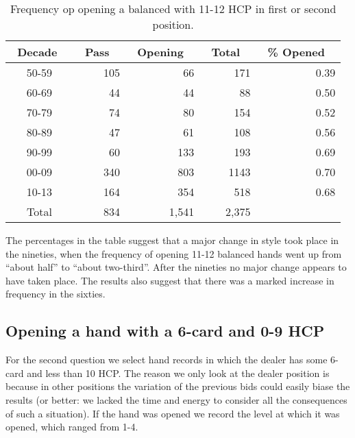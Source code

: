 \documentclass{icga}
\begin{document}
\begin{table}
\centering\footnotesize
\begin{tabular}{|c|r|r|r|r|}
\hline
\bf \ Decade \ & \bf \ Pass \ & \bf \ Opening \ & \bf \ Total \  & 
\bf \ \% Opened \ \\ \hline 
50-59 & 105 & 66 & 171 & 0.39\\
60-69 & 44 & 44 & 88 & 0.50\\
70-79 & 74 & 80 & 154 & 0.52\\
80-89 & 47 & 61 & 108 & 0.56\\
90-99 & 60 & 133 & 193 & 0.69\\
00-09 & 340 & 803 & 1143 & 0.70\\
10-13 & 164 & 354 & 518 & 0.68 \\ 
\hline
Total & 834 & 1,541 & 2,375 & \\ 
\hline
\end{tabular}
\caption{Frequency op opening a balanced with 11-12 HCP in first
  or second position.}
\label{tbl:opening-11-12-bal-2}
\end{table}

The percentages in the table suggest that a major change in style took
place in the nineties, when the frequency of opening 11-12 balanced
hands went up from ``about half'' to ``about two-third''. After the
nineties no major change appears to have taken place.  The results
also suggest that there was a marked increase in frequency in the
sixties.
 
\subsection{Opening a hand with a  6-card and 0-9 HCP}

For the second question we select hand records in which the dealer has
some 6-card and less than 10 HCP. The reason we only look at the
dealer position is because in other positions the variation of the
previous bids could easily biase the results (or better: we lacked the
time and energy to consider all the consequences of such a situation).
If the hand was opened we record the level at which it was opened,
which ranged from 1-4.
\end{document}
